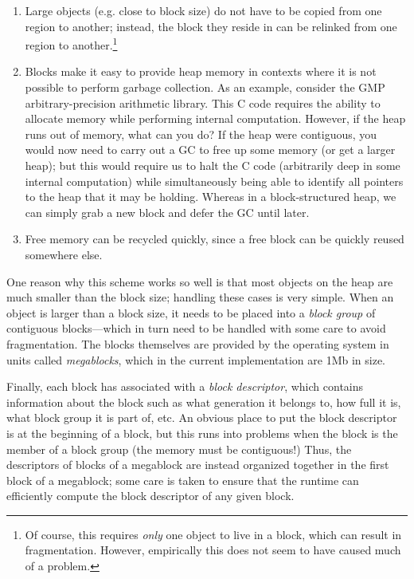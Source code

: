 \begin{enumerate}
    \item Large objects (e.g. close to block size) do not have to be copied from one region to
        another; instead, the block they reside in can be relinked from
        one region to another.\footnote{Of course, this requires \emph{only}
        one object to live in a block, which can result in fragmentation.
        However, empirically this does not seem to have caused much of a problem.}
    \item Blocks make it easy to provide heap memory in contexts where it is
        not possible to perform garbage collection.  As an example, consider
        the GMP arbitrary-precision arithmetic library.  This C code requires
        the ability to allocate memory while performing internal computation.
        However, if the heap runs out of memory, what can you do?  If the heap
        were contiguous, you would now need to carry out a GC to free up some memory
        (or get a larger heap); but this would require us to halt the C code
        (arbitrarily deep in some internal computation) while simultaneously being
        able to identify all pointers to the heap that it may be holding.  Whereas
        in a block-structured heap, we can simply grab a new block and defer the GC
        until later.
    \item Free memory can be recycled quickly, since a free block can be quickly
        reused somewhere else.
\end{enumerate}

One reason why this scheme works so well is that most objects on the
heap are much smaller than the block size; handling these cases is very
simple.  When an object is larger than a block size, it needs to be
placed into a \emph{block group} of contiguous blocks---which in turn
need to be handled with some care to avoid fragmentation.  The blocks
themselves are provided by the operating system in units called
\emph{megablocks}, which in the current implementation are 1Mb in size.

Finally, each block has associated with a \emph{block descriptor}, which
contains information about the block such as what generation it belongs to, how full it is, what block
group it is part of, etc.  An obvious place to put the block descriptor
is at the beginning of a block, but this runs into problems when the block
is the member of a block group (the memory must be contiguous!)
Thus, the descriptors of blocks of a megablock are instead organized together
in the first block of a megablock; some care is taken to ensure that the
runtime can efficiently compute the block descriptor of any given block.

